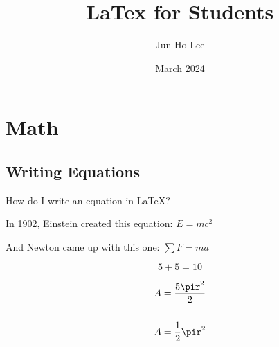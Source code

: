 \documentclass{article}
\title{LaTex for Students}
\author{Jun Ho Lee}
\date{March 2024}
\begin{document}
\newpage

\section{Math}

\subsection{Writing Equations}
How do I write an equation in \LaTeX?

    In 1902, Einstein created this equation: $E=mc^2$

    And Newton came up with this one: $\sum F=ma$

    \begin{equation}
        5+5=10
    \end{equation}

    \begin{equation}
        \begin{split}
            A & = \frac{5\pir^2}{2} \\\\
            A & = \frac{1}{2} \pir^2
        \end{split}
    \end{equation}
\end{document}
